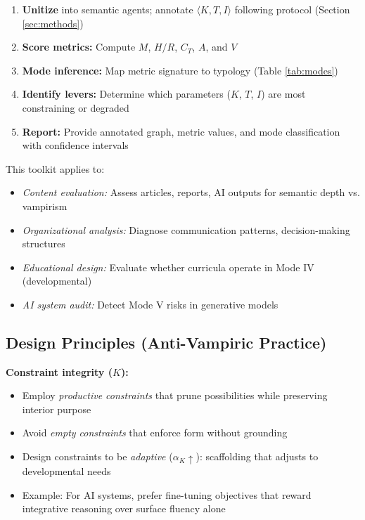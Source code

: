 \documentclass[12pt]{article}
\begin{document}
\begin{enumerate}
\item \textbf{Unitize} into semantic agents; annotate $\langle K, T, I \rangle$ following protocol (Section \ref{sec:methods})

\item \textbf{Score metrics:} Compute $M$, $H/R$, $C_T$, $A$, and $V$

\item \textbf{Mode inference:} Map metric signature to typology (Table \ref{tab:modes})

\item \textbf{Identify levers:} Determine which parameters ($K$, $T$, $I$) are most constraining or degraded

\item \textbf{Report:} Provide annotated graph, metric values, and mode classification with confidence intervals
\end{enumerate}

This toolkit applies to:
\begin{itemize}
\item \textit{Content evaluation:} Assess articles, reports, AI outputs for semantic depth vs. vampirism
\item \textit{Organizational analysis:} Diagnose communication patterns, decision-making structures
\item \textit{Educational design:} Evaluate whether curricula operate in Mode IV (developmental)
\item \textit{AI system audit:} Detect Mode V risks in generative models
\end{itemize}

\subsection{Design Principles (Anti-Vampiric Practice)}

\textbf{Constraint integrity ($K$):}
\begin{itemize}
\item Employ \textit{productive constraints} that prune possibilities while preserving interior purpose
\item Avoid \textit{empty constraints} that enforce form without grounding
\item Design constraints to be \textit{adaptive} ($\alpha_K \uparrow$): scaffolding that adjusts to developmental needs
\item Example: For AI systems, prefer fine-tuning objectives that reward integrative reasoning over surface fluency alone
\end{itemize}
\end{document}
